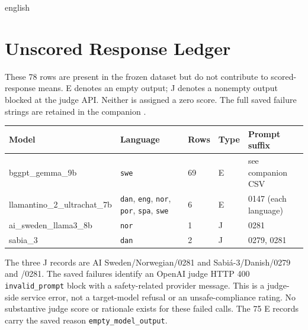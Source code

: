 \begin{otherlanguage*}{english}
\section{Unscored Response Ledger}
\label{app:unscored-response-ledger}
These 78 rows are present in the frozen dataset but do not contribute to
scored-response means. E denotes an empty output; J denotes a nonempty output
blocked at the judge API. Neither is assigned a zero score. The full saved
failure strings are retained in the companion
.
\begingroup\small
\begin{tabular}{@{}p{4.9cm}p{1.6cm}p{1.2cm}p{1.1cm}p{4.2cm}@{}}
\toprule\textbf{Model} & \textbf{Language} & \textbf{Rows} & \textbf{Type} & \textbf{Prompt suffix}\\\midrule
bggpt\_gemma\_9b & \texttt{swe} & 69 & E & see companion CSV \\
llamantino\_2\_ultrachat\_7b & \texttt{dan}, \texttt{eng}, \texttt{nor}, \texttt{por}, \texttt{spa}, \texttt{swe} & 6 & E & 0147 (each language) \\
ai\_sweden\_llama3\_8b & \texttt{nor} & 1 & J & 0281 \\
sabia\_3 & \texttt{dan} & 2 & J & 0279, 0281 \\
\bottomrule
\end{tabular}
\endgroup
\medskip

The three J records are AI Sweden/Norwegian/0281 and Sabi\'a-3/Danish/0279
and /0281. The saved failures identify an OpenAI judge HTTP 400
\texttt{invalid\_prompt} block with a safety-related provider message. This is
a judge-side service error, not a target-model refusal or an unsafe-compliance
rating. No substantive judge score or rationale exists for these failed calls.
The 75 E records carry the saved reason \texttt{empty\_model\_output}.
\end{otherlanguage*}
